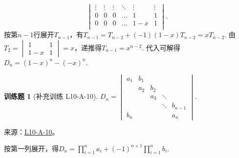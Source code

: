 \documentclass[12pt,fontset=fandol]{ctexart}
\newtheorem{exercise}{训练题}[section]
\begin{document}
\begin{solve}
\[\begin{vmatrix}
                    \vdots & \vdots & \vdots & \ddots & \vdots & \vdots \\
                    0      & 0      & 0      & \ldots & 1      & 1      \\
                    0      & 0      & 0      & \ldots & 1-x    & 1      \\
                \end{vmatrix}.\]
            按第$n-1$行展开$T_{n-1}$，有$T_{n-1}=T_{n-2}+(-1)(1-x)T_{n-2}=xT_{n-2}$. 由$T_2=\begin{vmatrix}
                    1&1\\1-x&1\end{vmatrix}=x$，递推得$T_{n-1}=x^{n-2}$. 代入可解得$D_n=(1-x)^n-(-x)^n$.
\end{solve}

\begin{exercise}[补充训练 L10-A-10]\label{prob:L10-A-10}
$ D_n=\begin{vmatrix}
                a_1 & b_1 &     &        &         \\
                    & a_2 & b_2 &        &         \\
                    &     & a_3 & \ddots &         \\
                    &     &     & \ddots & b_{n-1} \\
                b_n &     &     &        & a_n
            \end{vmatrix}$.
\end{exercise}
\noindent 来源：\href{https://github.com/yhwu-is/Linear-Algebra-Left-Undone/blob/new/%E8%AE%B2%E4%B9%89/%E4%B8%93%E9%A2%98/10%20%E8%A1%8C%E5%88%97%E5%BC%8F.tex}{L10-A-10}。
\begin{solve}
按第一列展开，得$D_n=\displaystyle\prod_{i=1}^na_i+(-1)^{n+1}\prod_{i=1}^nb_i$.
\end{solve}
\end{document}
